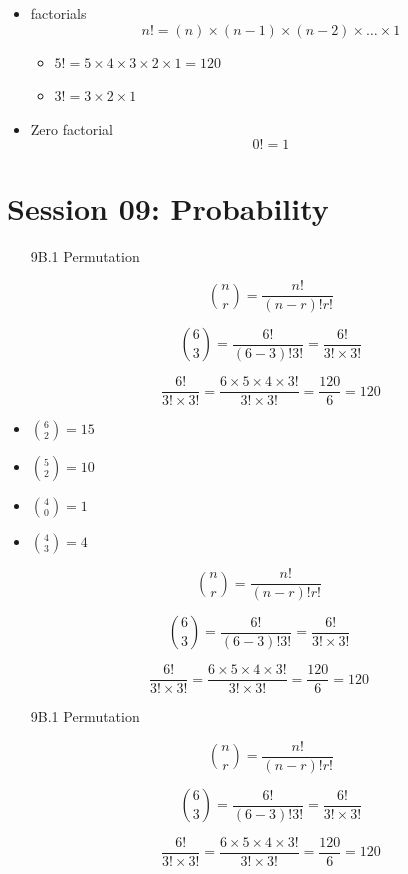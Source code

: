 \documentclass[12pt]{report}
\begin{document}
			\begin{itemize}
				\item factorials 
				\[ n! = (n)\times (n-1)\times(n-2) \times \ldots \times 1 \]
				\begin{itemize}
					\item $5! = 5 \times 4 \times 3 \times 2 \times 1 = 120 $
					\item $3! = 3 \times 2 \times 1$
				\end{itemize}
				\item Zero factorial
				\[ 0! =  1 \]
			\end{itemize}
\section*{Session 09: Probability}
\begin{itemize}
	\item[9B.1] Permutation
	
	\[ {n \choose r} = \frac{n!}{(n-r)! r!} \]
	
	
	\[ {6 \choose 3} = \frac{6!}{(6-3)! 3!} = \frac{6!}{3! \times 3!}\]
	
	
	\[ \frac{6!}{3! \times 3!} = \frac{6 \times 5 \times 4 \times 3!}{3! \times 3!} = \frac{120}{6} = 120\]
\end{itemize}

\begin{itemize}
	\item ${6 \choose 2} = 15$
	\item ${5 \choose 2} = 10$  
	\item ${4 \choose 0} = 1$  
	\item ${4 \choose 3} = 4$  
\end{itemize}

\begin{framed}
		
		\[ {n \choose r} = \frac{n!}{(n-r)! r!} \]
		\bigskip
		
		\[ {6 \choose 3} = \frac{6!}{(6-3)! 3!} = \frac{6!}{3! \times 3!}\]
		
		\bigskip
		\[ \frac{6!}{3! \times 3!} = \frac{6 \times 5 \times 4 \times 3!}{3! \times 3!} = \frac{120}{6} = 120\]
		\bigskip
\end{framed}
	
\begin{itemize}
	\item[9B.1] Permutation
	
	\[ {n \choose r} = \frac{n!}{(n-r)! r!} \]
	
	
	\[ {6 \choose 3} = \frac{6!}{(6-3)! 3!} = \frac{6!}{3! \times 3!}\]
	
	
	\[ \frac{6!}{3! \times 3!} = \frac{6 \times 5 \times 4 \times 3!}{3! \times 3!} = \frac{120}{6} = 120\]
\end{itemize}
\end{document}
